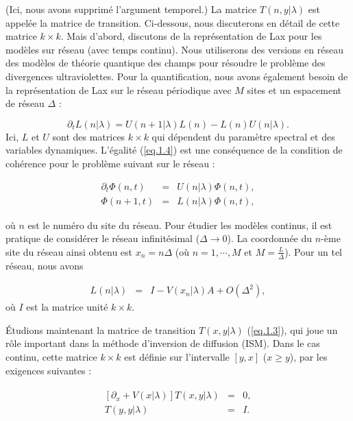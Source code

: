 (Ici, nous avons supprimé l'argument temporel.) La matrice \( T(n, y|\lambda) \) est appelée la matrice de transition. Ci-dessous, nous discuterons en détail de cette matrice \( k \times k \). Mais d'abord, discutons de la représentation de Lax pour les modèles sur réseau (avec temps continu). Nous utiliserons des versions en réseau des modèles de théorie quantique des champs pour résoudre le problème des divergences ultraviolettes. Pour la quantification, nous avons également besoin de la représentation de Lax sur le réseau périodique avec \( M \) sites et un espacement de réseau \( \Delta \) :

\begin{equation}
    \partial_t L(n|\lambda) = U(n + 1|\lambda) L(n) - L(n) U(n|\lambda).\label{eq.1.4} 
\end{equation}
Ici, \( L \) et \( U \) sont des matrices \( k \times k \) qui dépendent du paramètre spectral et des variables dynamiques. L'égalité (\ref{eq.1.4}) est une conséquence de la condition de cohérence pour le problème suivant sur le réseau :

\begin{eqnarray*}
	\partial_t \Phi(n,t) &=  &U(n|\lambda) \Phi(n,t), \\
    \Phi(n + 1,t) &=& L(n|\lambda) \Phi(n,t),	
\end{eqnarray*}

où \( n \) est le numéro du site du réseau. Pour étudier les modèles continus, il est pratique de considérer le réseau infinitésimal (\( \Delta \to 0 \)). La coordonnée du \( n \)-ème site du réseau ainsi obtenu est \( x_n = n\Delta \) (où \( n = 1, \cdots, M \) et \( M = \frac{L}{\Delta} \)). Pour un tel réseau, nous avons

\begin{eqnarray}
    L(n|\lambda)& = &I - V(x_n|\lambda) A + O(\Delta^2),
\end{eqnarray}
où \( I \) est la matrice unité \( k \times k \).

Étudions maintenant la matrice de transition \( T(x, y|\lambda) \) (\ref{eq.1.3}), qui joue un rôle important dans la méthode d'inversion de diffusion (ISM). Dans le cas continu, cette matrice \( k \times k \) est définie sur l'intervalle \( [y, x] \) (\( x \geq y \)), par les exigences suivantes :

\begin{eqnarray}
	\left. \begin{array}{rcl} [\partial_x + V(x|\lambda)] T(x, y|\lambda)  &=& 0, \\ T(y, y|\lambda) & =  & I.\end{array} \right. \label{eq.1.6}
\end{eqnarray}

